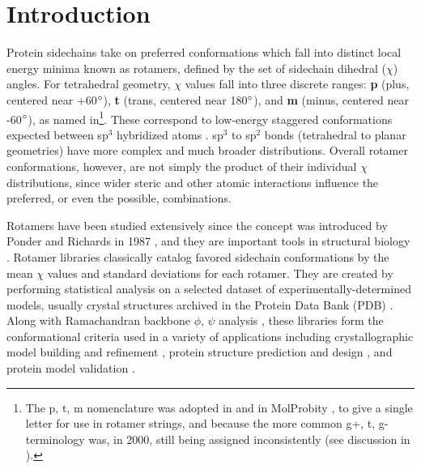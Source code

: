 \section{Introduction}
Protein sidechains take on preferred conformations which fall into distinct local energy minima known as rotamers, defined by the set of sidechain dihedral ($\chi$) angles. For tetrahedral geometry, $\chi$ values fall into three discrete ranges: \textbf{p} (plus, centered near +60$\degree$), \textbf{t} (trans, centered near 180$\degree$), and \textbf{m} (minus, centered near -60$\degree$)\textcolor{changecolor}{, as named in\cite{lovell2000penultimate}\footnote{\textcolor{changecolor}{The p, t, m nomenclature was adopted in \cite{lovell2000penultimate} and in MolProbity \cite{Davis2004}, to give a single letter for use in rotamer strings, and because the more common g+, t, g- terminology was, in 2000, still being assigned inconsistently (see discussion in \cite{lovell2000penultimate}).}}}. These correspond to low-energy staggered conformations expected between sp$^{3}$ hybridized atoms \cite{Eyring1932}. sp$^{3}$ to sp$^{2}$ bonds (tetrahedral to planar geometries) have more complex and much broader distributions. Overall rotamer conformations, however, are not simply the product of their individual $\chi$ distributions, since wider steric and other atomic interactions influence the preferred, or even the possible, combinations.

Rotamers have been studied extensively since the concept was introduced by Ponder and Richards in 1987 \cite{Ponder1987}, and they are important tools in structural biology \cite{DunbrackJr2002431}. Rotamer libraries classically catalog favored sidechain conformations by the mean $\chi$ values and standard deviations for each rotamer. They are created by performing statistical analysis on a selected dataset of experimentally-determined models, usually crystal structures archived in the Protein Data Bank (PDB) \cite{Berman2000}. Along with Ramachandran backbone $\phi$, $\psi$ analysis \cite{RAMACHANDRAN1963,JSR_theplot_2013}, these libraries form the conformational criteria used in a variety of applications including crystallographic model building and refinement \textcolor{changecolor}{\cite{Arendall2005, Emsley:ba5144, Adams:2010fk, Winn2011, Joosten2011}}, protein structure prediction and design \cite{Bower1997, Kuhlman21112003, Gainza:2012}, and protein model validation \cite{Laskowski:gl0276, Hooft1996, Chen:2010kx}.

